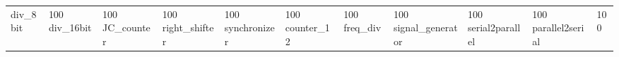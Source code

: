 \begin{tabular}{lllllll}
div\_8bit & \color{black} {} 100%
div\_16bit & \color{black} {} 100%
JC\_counter & \color{black} {} 100%
right\_shifter & \color{black} {} 100%
synchronizer & \color{black} {} 100%
counter\_12 & \color{black} {} 100%
freq\_div & \color{black} {} 100%
signal\_generator & \color{black} {} 100%
serial2parallel & \color{black} {} 100%
parallel2serial & 100%

\end{tabular}
